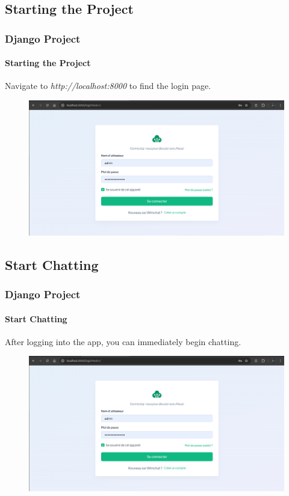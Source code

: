 \documentclass[
	11pt, %
]{beamer}
\begin{document}

\subsection{Starting the Project}

\begin{frame}
	\frametitle{Django Project}
	\framesubtitle{Starting the Project}
	
	Navigate to \textit{http://localhost:8000} to find the login page.
	
	\begin{figure}
		\includegraphics[width=1\linewidth]{starting_the_project.png}
	\end{figure}
	
\end{frame}


\subsection{Start Chatting}

\begin{frame}
	\frametitle{Django Project}
	\framesubtitle{Start Chatting}
	
	After logging into the app, you can immediately begin chatting.
	
	\begin{figure}
		\includegraphics[width=1\linewidth]{starting_the_project.png}
	\end{figure}
	
\end{frame}
\end{document}
